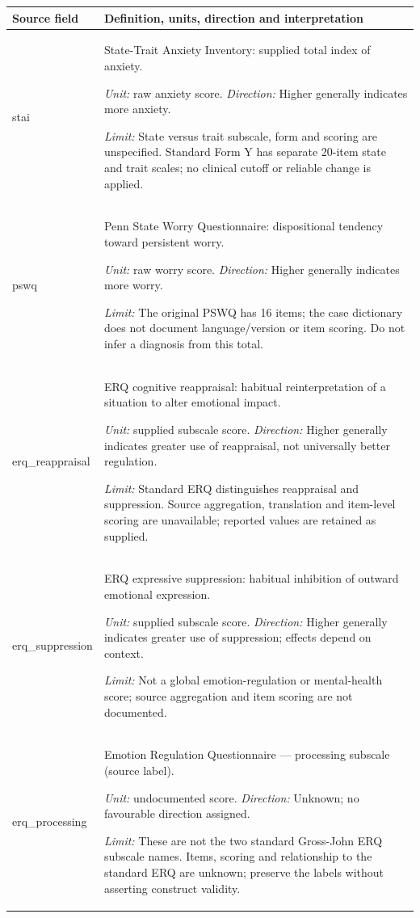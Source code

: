 \begin{longtable}{p{.22\linewidth}p{.70\linewidth}}
\toprule Source field & Definition, units, direction and interpretation \\
\midrule\endhead
{\ttfamily\footnotesize stai} & State-Trait Anxiety Inventory: supplied total index of anxiety.\par\textit{Unit:} raw anxiety score. \textit{Direction:} Higher generally indicates more anxiety.\par\textit{Limit:} State versus trait subscale, form and scoring are unspecified. Standard Form Y has separate 20-item state and trait scales; no clinical cutoff or reliable change is applied. \\[1pt]
{\ttfamily\footnotesize pswq} & Penn State Worry Questionnaire: dispositional tendency toward persistent worry.\par\textit{Unit:} raw worry score. \textit{Direction:} Higher generally indicates more worry.\par\textit{Limit:} The original PSWQ has 16 items; the case dictionary does not document language/version or item scoring. Do not infer a diagnosis from this total. \\[1pt]
{\ttfamily\footnotesize erq\_\allowbreak{}reappraisal} & ERQ cognitive reappraisal: habitual reinterpretation of a situation to alter emotional impact.\par\textit{Unit:} supplied subscale score. \textit{Direction:} Higher generally indicates greater use of reappraisal, not universally better regulation.\par\textit{Limit:} Standard ERQ distinguishes reappraisal and suppression. Source aggregation, translation and item-level scoring are unavailable; reported values are retained as supplied. \\[1pt]
{\ttfamily\footnotesize erq\_\allowbreak{}suppression} & ERQ expressive suppression: habitual inhibition of outward emotional expression.\par\textit{Unit:} supplied subscale score. \textit{Direction:} Higher generally indicates greater use of suppression; effects depend on context.\par\textit{Limit:} Not a global emotion-regulation or mental-health score; source aggregation and item scoring are not documented. \\[1pt]
{\ttfamily\footnotesize erq\_\allowbreak{}processing} & Emotion Regulation Questionnaire --- processing subscale (source label).\par\textit{Unit:} undocumented score. \textit{Direction:} Unknown; no favourable direction assigned.\par\textit{Limit:} These are not the two standard Gross-John ERQ subscale names. Items, scoring and relationship to the standard ERQ are unknown; preserve the labels without asserting construct validity. \\[1pt]

\end{longtable}
